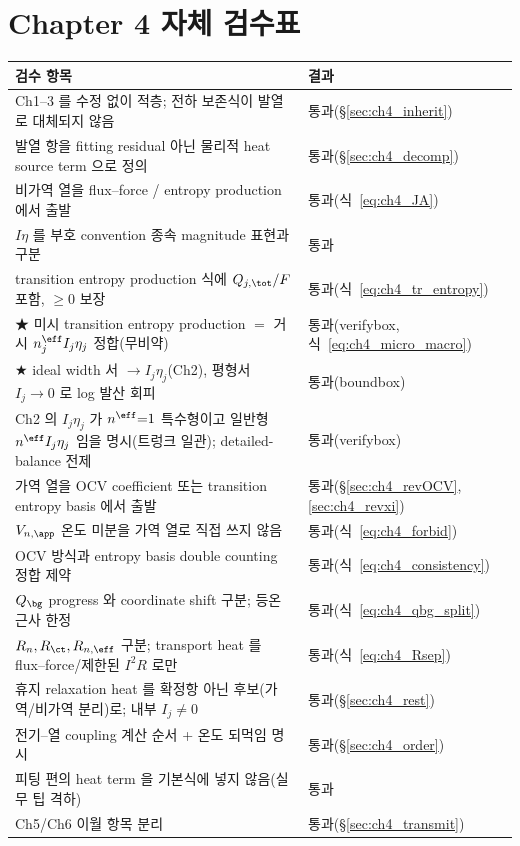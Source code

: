 \section{Chapter 4 자체 검수표}\label{sec:ch4_selfcheck}
{\small
\begin{longtable}{p{} p{}}
\toprule 검수 항목 & 결과 \\ \midrule \endhead
Ch1--3 를 수정 없이 적층; 전하 보존식이 발열로 대체되지 않음 & 통과(\S\ref{sec:ch4_inherit}) \\
발열 항을 fitting residual 아닌 물리적 heat source term 으로 정의 & 통과(\S\ref{sec:ch4_decomp}) \\
비가역 열을 flux--force / entropy production 에서 출발 & 통과(식~\eqref{eq:ch4_JA}) \\
$I\eta$ 를 부호 convention 종속 magnitude 표현과 구분 & 통과 \\
transition entropy production 식에 $Q_{j,\tot}/F$ 포함, $\ge0$ 보장 & 통과(식~\eqref{eq:ch4_tr_entropy}) \\
★ 미시 transition entropy production $=$ 거시 $n_j^{\eff}I_j\eta_j$ 정합(무비약) & 통과(verifybox,식~\eqref{eq:ch4_micro_macro}) \\
★ ideal width 서 $\to I_j\eta_j$(Ch2), 평형서 $I_j\to0$ 로 log 발산 회피 & 통과(boundbox) \\
Ch2 의 $I_j\eta_j$ 가 $n^{\eff}{=}1$ 특수형이고 일반형 $n^{\eff}I_j\eta_j$ 임을 명시(트렁크 일관); detailed-balance 전제 & 통과(verifybox) \\
가역 열을 OCV coefficient 또는 transition entropy basis 에서 출발 & 통과(\S\ref{sec:ch4_revOCV},\ref{sec:ch4_revxi}) \\
$V_{n,\app}$ 온도 미분을 가역 열로 직접 쓰지 않음 & 통과(식~\eqref{eq:ch4_forbid}) \\
OCV 방식과 entropy basis double counting 정합 제약 & 통과(식~\eqref{eq:ch4_consistency}) \\
$Q_\bg$ progress 와 coordinate shift 구분; 등온 근사 한정 & 통과(식~\eqref{eq:ch4_qbg_split}) \\
$R_n,R_{\ct},R_{n,\eff}$ 구분; transport heat 를 flux--force/제한된 $I^2R$ 로만 & 통과(식~\eqref{eq:ch4_Rsep}) \\
휴지 relaxation heat 를 확정항 아닌 후보(가역/비가역 분리)로; 내부 $I_j\ne0$ & 통과(\S\ref{sec:ch4_rest}) \\
전기--열 coupling 계산 순서 + 온도 되먹임 명시 & 통과(\S\ref{sec:ch4_order}) \\
피팅 편의 heat term 을 기본식에 넣지 않음(실무 팁 격하) & 통과 \\
Ch5/Ch6 이월 항목 분리 & 통과(\S\ref{sec:ch4_transmit}) \\
\bottomrule
\end{longtable}
}

